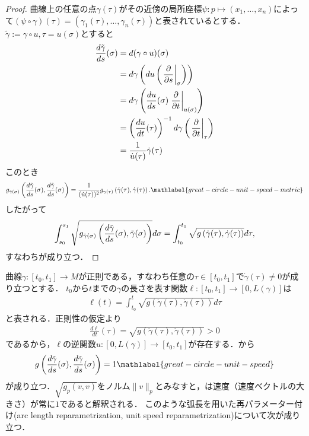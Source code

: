 \documentclass{ltjsarticle}
\begin{document}
\begin{proof}
曲線上の任意の点\(\gamma(\tau)\)がその近傍の局所座標\(\psi \colon p \mapsto (x_1, \ldots, x_n)\)によって\((\psi \circ \gamma)(\tau) = (\gamma_1(\tau), \ldots, \gamma_n(\tau))\)と表されているとする．
\(\tilde{\gamma} := \gamma \circ u, \tau = u(\sigma)\)とすると
\begin{align*}
    \frac{d\tilde{\gamma}}{ds}(\sigma)
    &= d(\gamma \circ u)(\sigma) \\
    &= d\gamma \left(du \left(\left.\frac{\partial}{\partial s}\right\lvert_{\sigma}\right) \right) \\
    &= d\gamma \left(\frac{du}{ds}(\sigma) \left.\frac{\partial}{\partial t}\right\lvert_{u(\sigma)} \right) \\
    &= \left(\frac{du}{dt}(\tau) \right)^{-1} d\gamma\left(\left.\frac{\partial}{\partial t}\right\lvert_{\tau}\right) \\
    &= \frac{1}{\dot{u}(\tau)} \dot{\gamma}(\tau)
\end{align*}
このとき
\begin{align}
    g_{\tilde{\gamma}(\sigma)}\left(\frac{d\tilde{\gamma}}{ds}(\sigma), \frac{d\tilde{\gamma}}{ds}(\sigma)\right)
    = \frac{1}{(\dot{u}(\tau))^2}
    g_{\gamma(\tau)}\left(\dot{\gamma}(\tau), \dot{\gamma}(\tau)\right).
    \mathlabel{great-circle-unit-speed-metric}
\end{align}
したがって
\begin{align*}
    \int_{s_0}^{s_1} \sqrt{%
        g_{\tilde{\gamma}(\sigma)}\left(\frac{d\tilde{\gamma}}{ds}(\sigma), \tilde{\gamma}(\sigma)\right)
    } d\sigma
    = \int_{t_0}^{t_1} \sqrt{%
        g\left(\dot{\gamma}(\tau), \dot{\gamma}(\tau)\right)
    } d\tau,
\end{align*}
すなわちが成り立つ．
\end{proof}

曲線\(\gamma \colon [t_0, t_1] \to M\)が正則である，すなわち任意の\(\tau \in [t_0, t_1]\)で\(\dot{\gamma}(\tau) \neq 0\)が成り立つとする．
\(t_0\)から\(t\)までの\(\gamma\)の長さを表す関数\(\ell \colon [t_0, t_1] \to [0, L(\gamma)]\)は
\begin{align*}
    \ell(t) = \int_{t_0}^{t} \sqrt{g(\dot{\gamma}(\tau), \dot{\gamma}(\tau))} d \tau
\end{align*}
と表される．正則性の仮定より
\begin{align*}
    \frac{d\ell}{dt}(\tau) = \sqrt{g(\dot{\gamma}(\tau), \dot{\gamma}(\tau))} > 0
\end{align*}
であるから，\(\ell\)の逆関数\(u \colon [0, L(\gamma)] \to [t_0, t_1]\)が存在する．から
\begin{align}
    g\left(\frac{d\tilde{\gamma}}{ds}(\sigma), \frac{d\tilde{\gamma}}{ds}(\sigma)\right) = 1
    \mathlabel{great-circle-unit-speed}
\end{align}
が成り立つ．\(\sqrt{g_p(v, v)}\)をノルム\(\lVert v \rVert_p\)とみなすと，は速度（速度ベクトルの大きさ）が常に\(1\)であると解釈される．
このような弧長を用いた再パラメーター付け(arc length reparametrization, unit speed reparametrization)について次が成り立つ．
\end{document}
